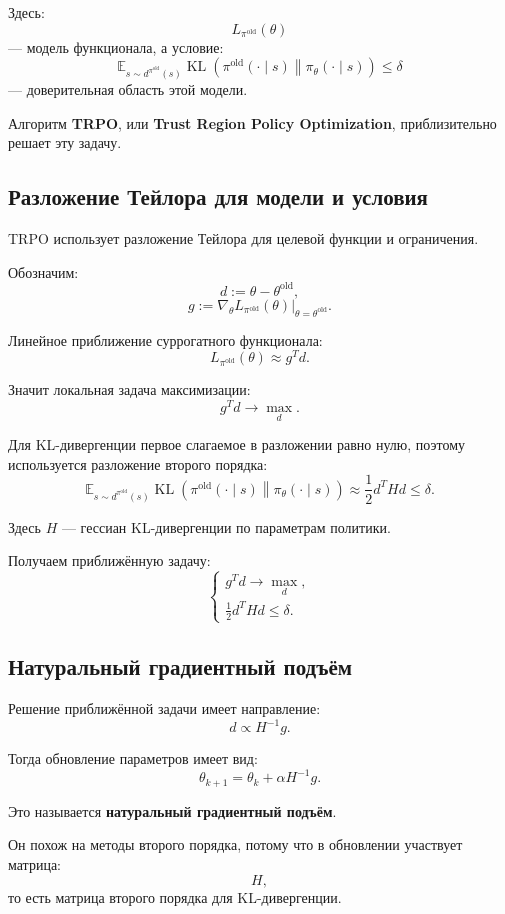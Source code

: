 \documentclass[12pt,a4paper]{article}
\begin{document}
Здесь:
\[
L_{\pi^{\mathrm{old}}}(\theta)
\]
--- модель функционала, а условие:
\[
\mathbb E_{s\sim d^{\pi^{\mathrm{old}}}(s)}
\operatorname{KL}
\left(
\pi^{\mathrm{old}}(\cdot\mid s)
\middle\|
\pi_\theta(\cdot\mid s)
\right)
\le
\delta
\]
--- доверительная область этой модели.

Алгоритм \textbf{TRPO}, или \textbf{Trust Region Policy Optimization}, приблизительно решает эту задачу.

\subsection{Разложение Тейлора для модели и условия}

TRPO использует разложение Тейлора для целевой функции и ограничения.

Обозначим:
\[
d
:=
\theta-\theta^{\mathrm{old}},
\]
\[
g
:=
\left.
\nabla_\theta
L_{\pi^{\mathrm{old}}}(\theta)
\right|_{\theta=\theta^{\mathrm{old}}}.
\]

Линейное приближение суррогатного функционала:
\[
L_{\pi^{\mathrm{old}}}(\theta)
\approx
g^T d.
\]

Значит локальная задача максимизации:
\[
g^T d
\to
\max_d.
\]

Для KL-дивергенции первое слагаемое в разложении равно нулю, поэтому используется разложение второго порядка:
\[
\mathbb E_{s\sim d^{\pi^{\mathrm{old}}}(s)}
\operatorname{KL}
\left(
\pi^{\mathrm{old}}(\cdot\mid s)
\middle\|
\pi_\theta(\cdot\mid s)
\right)
\approx
\frac{1}{2}
d^T H d
\le
\delta.
\]

Здесь $H$ --- гессиан KL-дивергенции по параметрам политики.

Получаем приближённую задачу:
\[
\begin{cases}
g^T d
\to
\max\limits_d,
\\[0.4em]
\frac{1}{2}d^T H d
\le
\delta.
\end{cases}
\]

\subsection{Натуральный градиентный подъём}

Решение приближённой задачи имеет направление:
\[
d
\propto
H^{-1}g.
\]

Тогда обновление параметров имеет вид:
\[
\theta_{k+1}
=
\theta_k
+
\alpha
H^{-1}g.
\]

Это называется \textbf{натуральный градиентный подъём}.

Он похож на методы второго порядка, потому что в обновлении участвует матрица:
\[
H,
\]
то есть матрица второго порядка для KL-дивергенции.
\end{document}
